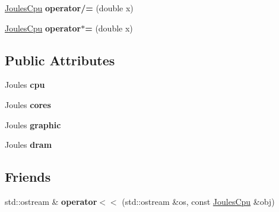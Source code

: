 \begin{DoxyCompactItemize}
\item 
\hypertarget{classmammut_1_1energy_1_1JoulesCpu_a3a62f9fbff1613c13df0dcac7d717f41}{\hyperlink{classmammut_1_1energy_1_1JoulesCpu}{Joules\-Cpu} {\bfseries operator/=} (double x)}\label{classmammut_1_1energy_1_1JoulesCpu_a3a62f9fbff1613c13df0dcac7d717f41}

\item 
\hypertarget{classmammut_1_1energy_1_1JoulesCpu_ae9c3b9fadb2004a77e77456afbdb49d7}{\hyperlink{classmammut_1_1energy_1_1JoulesCpu}{Joules\-Cpu} {\bfseries operator$\ast$=} (double x)}\label{classmammut_1_1energy_1_1JoulesCpu_ae9c3b9fadb2004a77e77456afbdb49d7}

\end{DoxyCompactItemize}
\subsection*{Public Attributes}
\begin{DoxyCompactItemize}
\item 
\hypertarget{classmammut_1_1energy_1_1JoulesCpu_a406c57faafd2a94f605fc011f34b1b09}{Joules {\bfseries cpu}}\label{classmammut_1_1energy_1_1JoulesCpu_a406c57faafd2a94f605fc011f34b1b09}

\item 
\hypertarget{classmammut_1_1energy_1_1JoulesCpu_a00f80dc44f7ccbef2c27042253182b26}{Joules {\bfseries cores}}\label{classmammut_1_1energy_1_1JoulesCpu_a00f80dc44f7ccbef2c27042253182b26}

\item 
\hypertarget{classmammut_1_1energy_1_1JoulesCpu_ae83ef5e6029300e9a784f92391e325d0}{Joules {\bfseries graphic}}\label{classmammut_1_1energy_1_1JoulesCpu_ae83ef5e6029300e9a784f92391e325d0}

\item 
\hypertarget{classmammut_1_1energy_1_1JoulesCpu_a635372e3958cf576dd9d5076b7636ad6}{Joules {\bfseries dram}}\label{classmammut_1_1energy_1_1JoulesCpu_a635372e3958cf576dd9d5076b7636ad6}

\end{DoxyCompactItemize}
\subsection*{Friends}
\begin{DoxyCompactItemize}
\item 
\hypertarget{classmammut_1_1energy_1_1JoulesCpu_ae94a8fa2c7633d8dc71580f262de35b4}{std\-::ostream \& {\bfseries operator$<$$<$} (std\-::ostream \&os, const \hyperlink{classmammut_1_1energy_1_1JoulesCpu}{Joules\-Cpu} \&obj)}\label{classmammut_1_1energy_1_1JoulesCpu_ae94a8fa2c7633d8dc71580f262de35b4}

\end{DoxyCompactItemize}


